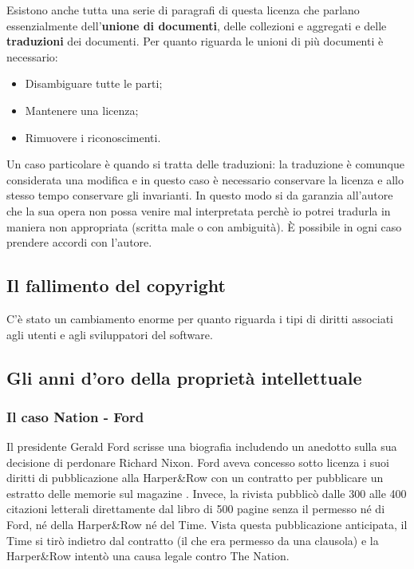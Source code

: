 Esistono anche tutta una serie di paragrafi di questa licenza che parlano essenzialmente dell'\textbf{unione di documenti}, delle collezioni e aggregati e delle \textbf{traduzioni} dei documenti. Per quanto riguarda le unioni di più documenti è necessario:

\begin{itemize}

\item Disambiguare tutte le parti;
\item Mantenere una licenza;
\item Rimuovere i riconoscimenti.

\end{itemize}

Un caso particolare è quando si tratta delle traduzioni: la traduzione è comunque considerata una modifica e in questo caso è necessario conservare la licenza e allo stesso tempo conservare gli invarianti. In questo modo si da garanzia all'autore che la sua opera non possa venire mal interpretata perchè io potrei tradurla in maniera non appropriata (scritta male o con ambiguità). È possibile in ogni caso prendere accordi con l'autore.

\subsection{Il fallimento del copyright}

C'è stato un cambiamento enorme per quanto riguarda i tipi di diritti associati agli utenti e agli sviluppatori del software. 

\subsection{Gli anni d'oro della proprietà intellettuale}
\subsubsection{Il caso Nation - Ford}

Il presidente Gerald Ford scrisse una biografia includendo un anedotto sulla sua decisione di perdonare Richard Nixon. 
Ford aveva concesso sotto licenza i suoi diritti di pubblicazione alla Harper\&Row con un contratto per pubblicare un estratto delle memorie sul magazine . 
Invece, la rivista  pubblicò dalle 300 alle 400 citazioni letterali direttamente dal libro di 500 pagine senza il permesso né di Ford, né della Harper\&Row né del Time.
Vista questa pubblicazione anticipata, il Time si tirò indietro dal contratto (il che era permesso da una clausola) e la Harper\&Row intentò una causa legale contro The Nation.\\

